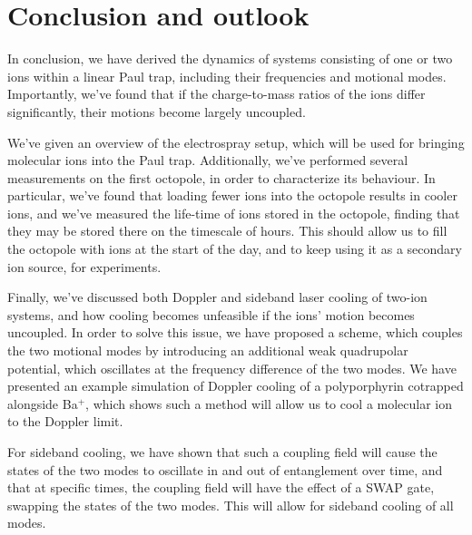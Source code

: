 
\chapter{Conclusion and outlook}
\label{chap:future}
In conclusion, we have derived the dynamics of systems consisting of one or two ions within a linear Paul trap, including their frequencies and motional modes. Importantly, we've found that if the charge-to-mass ratios of the ions differ significantly, their motions become largely uncoupled.

We've given an overview of the electrospray setup, which will be used for bringing molecular ions into the Paul trap. Additionally, we've performed several measurements on the first octopole, in order to characterize its behaviour.
In particular, we've found that loading fewer ions into the octopole results in cooler ions, and we've measured the life-time of ions stored in the octopole, finding that they may be stored there on the timescale of hours. This should allow us to fill the octopole with ions at the start of the day, and to keep using it as a secondary ion source, for experiments.

Finally, we've discussed both Doppler and sideband laser cooling of two-ion systems, and how cooling becomes unfeasible if the ions' motion becomes uncoupled. In order to solve this issue, we have proposed a scheme, which couples the two motional modes by introducing an additional weak quadrupolar potential, which oscillates at the frequency difference of the two modes.
We have presented an example simulation of Doppler cooling of a polyporphyrin cotrapped alongside Ba$^+$, which shows such a method will allow us to cool a molecular ion to the Doppler limit.


For sideband cooling, we have shown that such a coupling field will cause the states of the two modes to oscillate in and out of entanglement over time, and that at specific times, the coupling field will have the effect of a SWAP gate, swapping the states of the two modes. This will allow for sideband cooling of all modes.


